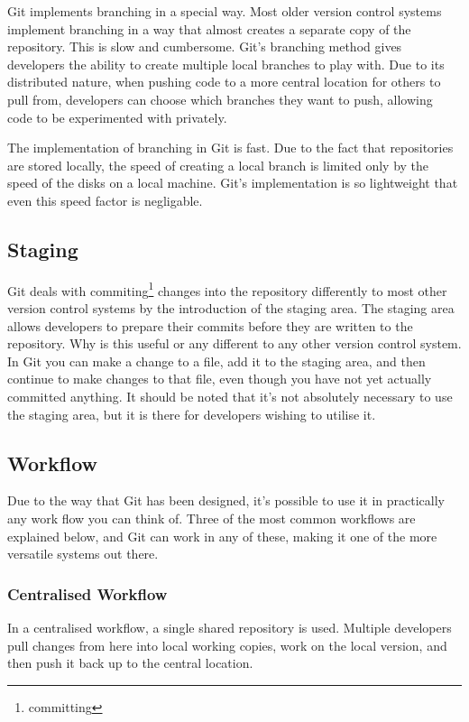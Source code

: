 Git implements branching in a special way.
Most older version control systems implement branching in a way that almost creates a separate copy of the repository.
This is slow and cumbersome.
Git's branching method gives developers the ability to create multiple local branches to play with.
Due to its distributed nature, when pushing code to a more central location for others to pull from, developers can choose which branches they want to push, allowing code to be experimented with privately.

The implementation of branching in Git is fast.
Due to the fact that repositories are stored locally, the speed of creating a local branch is limited only by the speed of the disks on a local machine.
Git's implementation is so lightweight that even this speed factor is negligable.

\subsection{Staging}

Git deals with commiting\footnote{committing} changes into the repository differently to most other version control systems by the introduction of the staging area.
The staging area allows developers to prepare their commits before they are written to the repository.
Why is this useful or any different to any other version control system.
In Git you can make a change to a file, add it to the staging area, and then continue to make changes to that file, even though you have not yet actually committed anything.
It should be noted that it's not absolutely necessary to use the staging area, but it is there for developers wishing to utilise it.

\subsection{Workflow}

Due to the way that Git has been designed, it's possible to use it in practically any work flow you can think of.
Three of the most common workflows are explained below, and Git can work in any of these, making it one of the more versatile systems out there.

\subsubsection{Centralised Workflow}

In a centralised workflow, a single shared repository is used.
Multiple developers pull changes from here into local working copies, work on the local version, and then push it back up to the central location.

